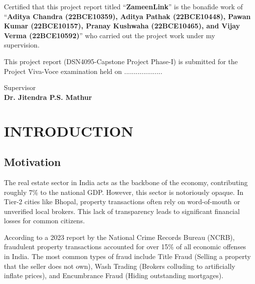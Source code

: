 \documentclass[12pt,a4paper]{report}
\begin{document}
\vspace{1cm}

Certified that this project report titled ``\textbf{ZameenLink}'' is the bonafide work of ``\textbf{Aditya Chandra (22BCE10359), Aditya Pathak (22BCE10448), Pawan Kumar (22BCE10157), Pranay Kushwaha (22BCE10465), and Vijay Verma (22BCE10592)}'' who carried out the project work under my supervision.

\vspace{1cm}

This project report (DSN4095-Capstone Project Phase-I) is submitted for the Project Viva-Voce examination held on ....................

\vspace{3cm}

\begin{flushright}
    Supervisor\\
    \vspace{1cm}
    \textbf{Dr. Jitendra P.S. Mathur}
\end{flushright}

\newpage
\tableofcontents
\listoffigures
\listoftables

\chapter{INTRODUCTION}

\section{Motivation}
The real estate sector in India acts as the backbone of the economy, contributing roughly 7\% to the national GDP. However, this sector is notoriously opaque. In Tier-2 cities like Bhopal, property transactions often rely on word-of-mouth or unverified local brokers. This lack of transparency leads to significant financial losses for common citizens.

According to a 2023 report by the National Crime Records Bureau (NCRB), fraudulent property transactions accounted for over 15\% of all economic offenses in India. The most common types of fraud include Title Fraud (Selling a property that the seller does not own), Wash Trading (Brokers colluding to artificially inflate prices), and Encumbrance Fraud (Hiding outstanding mortgages).
\end{document}
